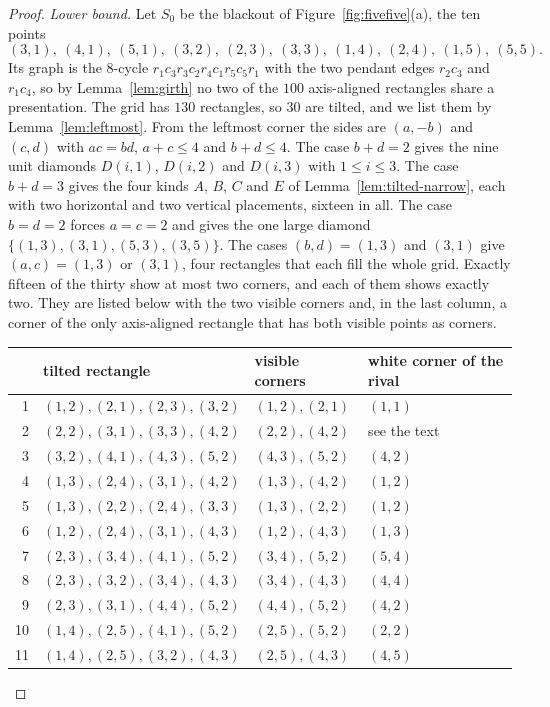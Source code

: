 \begin{proof}
\emph{Lower bound.} Let $S_0$ be the blackout of Figure~\ref{fig:fivefive}(a), the ten points
\[
(3,1),\ (4,1),\ (5,1),\ (3,2),\ (2,3),\ (3,3),\ (1,4),\ (2,4),\ (1,5),\ (5,5).
\]
Its graph is the $8$-cycle $r_1c_3r_3c_2r_4c_1r_5c_5r_1$ with the two pendant edges $r_2c_3$
and $r_1c_4$, so by Lemma~\ref{lem:girth} no two of the $100$ axis-aligned rectangles share a
presentation. The grid has $130$ rectangles, so $30$ are tilted, and we list them by
Lemma~\ref{lem:leftmost}. From the leftmost corner the sides are $(a,-b)$ and $(c,d)$ with
$ac=bd$, $a+c\le4$ and $b+d\le4$. The case $b+d=2$ gives the nine unit diamonds $D(i,1)$,
$D(i,2)$ and $D(i,3)$ with $1\le i\le3$. The case $b+d=3$ gives the four kinds $A$, $B$, $C$
and $E$ of Lemma~\ref{lem:tilted-narrow}, each with two horizontal and two vertical placements,
sixteen in all. The case $b=d=2$ forces $a=c=2$ and gives the one large diamond
$\{(1,3),(3,1),(5,3),(3,5)\}$. The cases $(b,d)=(1,3)$ and $(3,1)$ give $(a,c)=(1,3)$ or
$(3,1)$, four rectangles that each fill the whole grid. Exactly fifteen of the thirty show at
most two corners, and each of them shows exactly two. They are listed below with the two
visible corners and, in the last column, a corner of the only axis-aligned rectangle that has
both visible points as corners.
\begin{center}\small
\begin{tabular}{@{}rlll@{}}
\toprule
 & tilted rectangle & visible corners & white corner of the rival \\
\midrule
1 & $(1,2),(2,1),(2,3),(3,2)$ & $(1,2),(2,1)$ & $(1,1)$ \\
2 & $(2,2),(3,1),(3,3),(4,2)$ & $(2,2),(4,2)$ & see the text \\
3 & $(3,2),(4,1),(4,3),(5,2)$ & $(4,3),(5,2)$ & $(4,2)$ \\
4 & $(1,3),(2,4),(3,1),(4,2)$ & $(1,3),(4,2)$ & $(1,2)$ \\
5 & $(1,3),(2,2),(2,4),(3,3)$ & $(1,3),(2,2)$ & $(1,2)$ \\
6 & $(1,2),(2,4),(3,1),(4,3)$ & $(1,2),(4,3)$ & $(1,3)$ \\
7 & $(2,3),(3,4),(4,1),(5,2)$ & $(3,4),(5,2)$ & $(5,4)$ \\
8 & $(2,3),(3,2),(3,4),(4,3)$ & $(3,4),(4,3)$ & $(4,4)$ \\
9 & $(2,3),(3,1),(4,4),(5,2)$ & $(4,4),(5,2)$ & $(4,2)$ \\
10 & $(1,4),(2,5),(4,1),(5,2)$ & $(2,5),(5,2)$ & $(2,2)$ \\
11 & $(1,4),(2,5),(3,2),(4,3)$ & $(2,5),(4,3)$ & $(4,5)$ \\

\end{tabular}
\end{center}
\end{proof}

